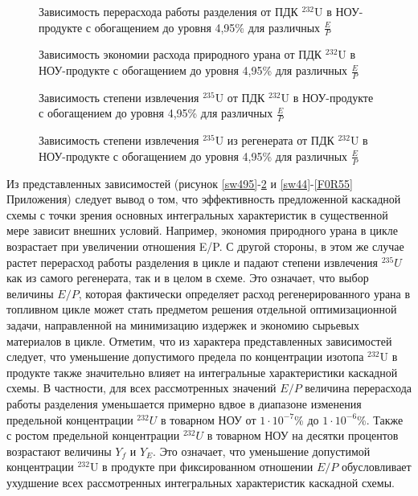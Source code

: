 \begin{figure}[ht]
    \centering
    \begin{minipage}{.5\textwidth}
      \centering
      
\caption{{Зависимость перерасхода работы разделения от ПДК $^{232}$U в НОУ-продукте с обогащением до уровня 4,95\% для различных $\frac{E}{P}${\label{sw495}}}}
    \end{minipage}%
    \begin{minipage}{.5\textwidth}
      \centering
      
    \caption{{Зависимость экономии расхода природного урана от ПДК $^{232}$U в НОУ-продукте с обогащением до уровня 4,95\% для различных $\frac{E}{P}${\label{F0R495}}}}
\end{minipage}
\end{figure}

\begin{figure}[ht]
    \centering
    \begin{minipage}{.5\textwidth}
      \centering
      
      \caption{{Зависимость степени извлечения $^{235}$U от ПДК $^{232}$U в НОУ-продукте с обогащением до уровня 4,95\% для различных $\frac{E}{P}${\label{ex495}}}}
    \end{minipage}%
    \begin{minipage}{.5\textwidth}
      \centering
      
      \caption{{Зависимость степени извлечения $^{235}$U из регенерата от ПДК $^{232}$U в НОУ-продукте с обогащением до уровня 4,95\% для различных $\frac{E}{P}${\label{exR495}}}}
\end{minipage}
\end{figure}

Из представленных зависимостей (рисунок \ref{sw495}-\ref{exR495} и \ref{sw44}-\ref{F0R55} Приложения) следует вывод о том, что эффективность предложенной каскадной схемы с точки зрения основных интегральных характеристик в существенной мере зависит внешних условий. Например, экономия природного урана в цикле возрастает при увеличении отношения E/P. С другой стороны, в этом же случае растет перерасход работы разделения в цикле и падают степени извлечения $^{235}U$ как из самого регенерата, так и в целом в схеме. Это означает, что выбор величины $E/P$, которая фактически определяет расход регенерированного урана в топливном цикле может стать предметом решения отдельной оптимизационной задачи, направленной на минимизацию издержек и экономию сырьевых материалов в цикле. 
Отметим, что из характера представленных зависимостей следует, что уменьшение допустимого предела по концентрации изотопа $^{232}$U в продукте также значительно влияет на интегральные характеристики каскадной схемы. В частности, для всех рассмотренных значений $E/P$ величина перерасхода работы разделения уменьшается примерно вдвое в диапазоне изменения предельной концентрации $^{232}U$ в товарном НОУ от $1\cdot10^{-7}$\% до $1\cdot10^{-6}$\%. Также с ростом предельной концентрации $^{232}U$ в товарном НОУ на десятки процентов возрастают величины $Y_f$ и $Y_{E}$. Это означает, что уменьшение допустимой концентрации $^{232}$U в продукте при фиксированном отношении $E/P$ обусловливает ухудшение всех рассмотренных интегральных характеристик каскадной схемы. 

